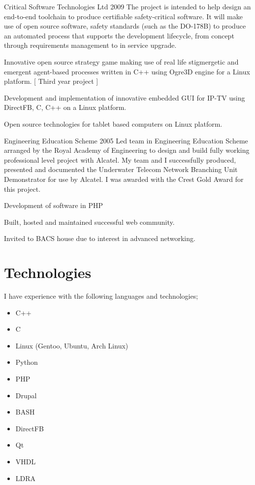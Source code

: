 \documentclass[overlapped,line,letterpaper]{res}
\begin{document}
\begin{resume}
  {Critical Software Technologies Ltd}
  {2009}
{ 
    The project is intended to help design an end-to-end toolchain to produce 
    certifiable safety-critical software. 
    It will make use of open source software, safety standards (such as the 
    DO-178B) to produce an automated process that supports the development 
    lifecycle, from concept through requirements management to in service 
    upgrade. 
}

{
    Innovative open source strategy game making use of real life stigmergetic 
    and emergent agent-based processes written in C++ using Ogre3D engine for a 
    Linux platform. [ Third year project ]
}

{ 
    Development and implementation of innovative embedded GUI for IP-TV using 
    DirectFB, C, C++ on a Linux platform.
}

{ 
    Open source technologies for tablet based computers on Linux platform. 
}

  {Engineering Education Scheme}
  {2005}
{
    Led team in Engineering Education Scheme arranged by the Royal Academy of
    Engineering to design and build fully working professional level project 
    with Alcatel.
    My team and I successfully produced, presented and documented the Underwater
    Telecom Network Branching Unit Demonstrator for use by Alcatel. 
    I was awarded with the Crest Gold Award for this project.
}

{ 
    Development of software in PHP 
} 

{ 
    Built, hosted and maintained successful web community. 
}

{
        Invited to BACS house due to interest in advanced networking.
}

\section{\bf{Technologies} }
I have experience with the following languages and technologies;
\begin{itemize}
 \item C++
 \item C
 \item Linux (Gentoo, Ubuntu, Arch Linux)
 \item Python 
 \item PHP
 \item Drupal
 \item BASH
 \item DirectFB
 \item Qt
 \item VHDL
 \item LDRA
\end{itemize}


\end{resume}
\end{document}
